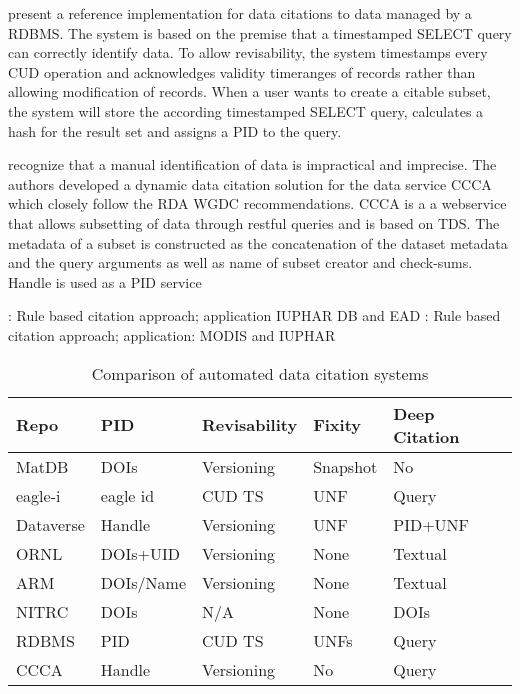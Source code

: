 \documentclass[letterpaper, parskip=half]{scrartcl}
\begin{document}
\cite{Proll2013} present a reference implementation for data citations to data managed by a \gls{RDBMS}. 
The system is based on the premise that a timestamped SELECT query can correctly identify data. To allow revisability, the system timestamps every \gls{CUD} operation and acknowledges validity timeranges of records rather than allowing modification of records. When a user wants to create a citable subset, the system will store the according timestamped SELECT query, calculates a hash for the result set and assigns a PID to the query. 

\cite{Schubert2019} recognize that a manual identification of data is impractical and imprecise. The authors developed a dynamic data citation solution for the data service \gls{CCCA} which closely follow the \gls{RDA} \gls{WGDC} \citep{Rauber2015, Rauber2015} recommendations. CCCA is a a webservice that allows subsetting of data through restful queries and is based on \gls{TDS}.
The metadata of a subset is constructed as the concatenation of the dataset metadata and the query arguments as well as name of subset creator and check-sums. 
Handle is used as a PID service


\citep{Buneman2010}: Rule based citation approach; application IUPHAR DB and EAD
\citep{Buneman2016}: Rule based citation approach; application: MODIS and IUPHAR 

\begin{table}
\caption{Comparison of automated data citation systems}
\begin{tabular}{l l l l l}
\toprule
    Repo        & PID           & Revisability   & Fixity   & Deep Citation \\\midrule
    MatDB       & DOIs          & Versioning     & Snapshot & No  \\
    eagle-i     & eagle id      & CUD TS         & UNF      & Query\\
    Dataverse   & Handle        & Versioning     & UNF      & PID+UNF \\ 
    ORNL        & DOIs+UID      & Versioning     & None     & Textual \\
    ARM         & DOIs/Name     & Versioning     & None     & Textual \\
    NITRC       & DOIs          & N/A            & None     & DOIs  \\
    RDBMS       & PID           & CUD TS         & UNFs     & Query \\
    CCCA        & Handle        & Versioning    & No       & Query \\
\bottomrule     
\end{tabular}
\label{tab_citcomp}
\end{table}
\end{document}
